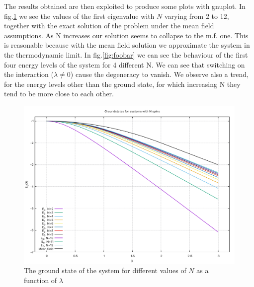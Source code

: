 \documentclass[prb,9pt,notitlepage]{revtex4-1}
\begin{document}
The results obtained are then exploited to produce some plots with gnuplot. In fig.\ref{ground_states} we see the values of the first eigenvalue with $N$ varying from 2 to 12, together with the exact solution of the problem under the mean field assumptions. As N increases our solution seems to collapse to the m.f. one. This is reasonable because with the mean field solution we approximate the system in the thermodynamic limit. In fig.\ref{fig:foobar} we can see the behaviour of the first four energy levels of the system for 4 different N. We can see that switching on the interaction ($\lambda\ne 0$) cause the degeneracy to vanish. We observe also a trend, for the energy levels other than the ground state, for which increasing N they tend to be more close to each other.

\begin{figure}[h]
    \includegraphics[width=.50\textwidth]{ground_states}\hfill
    \caption{The ground state of the system for different values of $N$ as a function of $\lambda$}\label{ground_states}
\end{figure}
\end{document}
